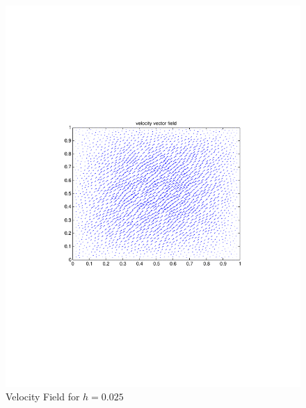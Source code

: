 \documentclass[12pt]{article}
\begin{document}
                \begin{figure}[htb]
                    \begin{center}
                \includegraphics[scale=0.50]{./../files/box/3q.pdf}
                \caption{Velocity Field for $h = 0.025$}
            \end{center}
            \end{figure}
\end{document}
